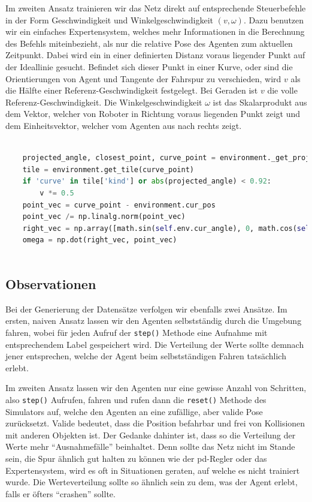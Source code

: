Im zweiten Ansatz trainieren wir das Netz direkt auf entsprechende Steuerbefehle in der Form Geschwindigkeit und Winkelgeschwindigkeit $(v, \omega)$. Dazu benutzen wir ein einfaches Expertensystem, welches mehr Informationen in die Berechnung des Befehls miteinbezieht, als nur die relative Pose des Agenten zum aktuellen Zeitpunkt. Dabei wird ein in einer definierten Distanz voraus liegender Punkt auf der Ideallinie gesucht. Befindet sich dieser Punkt in einer Kurve, oder sind die Orientierungen von Agent und Tangente der Fahrspur zu verschieden, wird $v$ als die Hälfte einer Referenz-Geschwindigkeit festgelegt. Bei Geraden ist $v$ die volle Referenz-Geschwindigkeit. Die Winkelgeschwindigkeit $\omega$ ist das Skalarprodukt aus dem Vektor, welcher von Roboter in Richtung voraus liegenden Punkt zeigt und dem Einheitsvektor, welcher vom Agenten aus nach rechts zeigt.

\begin{minipage}{\linewidth}
	\begin{lstlisting}[caption={Berechnung eines Steuerbefehls mit einfachem Expertensystem}, language=python]
	
	projected_angle, closest_point, curve_point = environment._get_projected_angle_difference(lookup_distance)
	tile = environment.get_tile(curve_point)
	if 'curve' in tile['kind'] or abs(projected_angle) < 0.92:
		v *= 0.5
	point_vec = curve_point - environment.cur_pos
	point_vec /= np.linalg.norm(point_vec)
	right_vec = np.array([math.sin(self.env.cur_angle), 0, math.cos(self.env.cur_angle)])
	omega = np.dot(right_vec, point_vec)
	
	\end{lstlisting}
\end{minipage}

\subsection{Observationen}

Bei der Generierung der Datensätze verfolgen wir ebenfalls zwei Ansätze. Im ersten, naiven Ansatz lassen wir den Agenten selbstständig durch die Umgebung fahren, wobei für jeden Aufruf der \texttt{step()} Methode eine Aufnahme mit entsprechendem Label gespeichert wird. Die Verteilung der Werte sollte demnach jener entsprechen, welche der Agent beim selbstständigen Fahren tatsächlich erlebt.

Im zweiten Ansatz lassen wir den Agenten nur eine gewisse Anzahl von Schritten, also \texttt{step()} Aufrufen, fahren und rufen dann die \texttt{reset()} Methode des Simulators auf, welche den Agenten an eine zufällige, aber valide Pose zurücksetzt. Valide bedeutet, dass die Position befahrbar und frei von Kollisionen mit anderen Objekten ist.
Der Gedanke dahinter ist, dass so die Verteilung der Werte mehr ``Ausnahmefälle'' beinhaltet. Denn sollte das Netz nicht im Stande sein, die Spur ähnlich gut halten zu können wie der \acs{pd}-Regler oder das Expertensystem, wird es oft in Situationen geraten, auf welche es nicht trainiert wurde. Die Werteverteilung sollte so ähnlich sein zu dem, was der Agent erlebt, falls er öfters ``crashen'' sollte.

